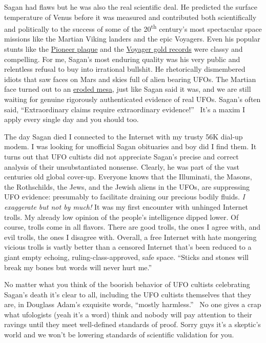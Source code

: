 Sagan had flaws but he was also the real scientific deal. He predicted
the surface temperature of Venus before it was measured and contributed
both scientifically and politically to the success of some of the
20\textsuperscript{th} century's most spectacular space missions like
the Martian Viking landers and the epic Voyagers. Even his popular
stunts like the
\href{https://www.space.com/17651-pioneer-10.html}{Pioneer plaque} and
the \href{https://voyager.jpl.nasa.gov/golden-record/}{Voyager gold
records} were classy and compelling. For me, Sagan's most enduring
quality was his very public and relentless refusal to buy into
irrational bullshit. He rhetorically dismembered idiots that saw faces
on Mars and skies full of alien bearing UFOs. The Martian face turned
out to an
\href{https://science.nasa.gov/science-news/science-at-nasa/2001/ast24may_1/}{eroded
mesa}, just like Sagan said it was, and we are still waiting for genuine
rigorously authenticated evidence of real UFOs. Sagan's often said,
``Extraordinary claims require extraordinary evidence!''~ It's a maxim I
apply every single day and you should too.

The day Sagan died I connected to the Internet with my trusty 56K
dial-up modem. I was looking for unofficial Sagan obituaries and boy did
I find them. It turns out that UFO cultists did not appreciate Sagan's
precise and correct analysis of their unsubstantiated nonsense. Clearly,
he was part of the vast centuries old global cover-up. Everyone knows
that the Illuminati, the Masons, the Rothschilds, the Jews, and the
Jewish aliens in the UFOs, are suppressing UFO evidence: presumably to
facilitate draining our precious bodily fluids. \emph{I exaggerate but
not by much!} It was my first encounter with unhinged Internet trolls.
My already low opinion of the people's intelligence dipped lower. Of
course, trolls come in all flavors. There are good trolls, the ones I
agree with, and evil trolls, the ones I disagree with. Overall, a free
Internet with hate mongering vicious trolls is vastly better than a
censored Internet that's been reduced to a giant empty echoing,
ruling-class-approved, safe space. ``Sticks and stones will break my
bones but words will never hurt me.''

No matter what you think of the boorish behavior of UFO cultists
celebrating Sagan's death it's clear to all, including the UFO cultists
themselves that they are, in Douglass Adam's exquisite words, ``mostly
harmless.''~ No one gives a crap what ufologists (yeah it's a word)
think and nobody will pay attention to their ravings until they meet
well-defined standards of proof. Sorry guys it's a skeptic's world and
we won't be lowering standards of scientific validation for you.

